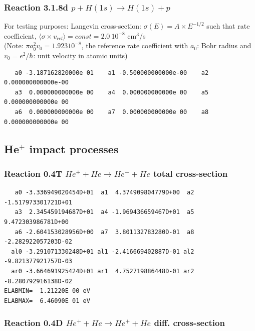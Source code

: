 \documentclass[12pt,dvips]{article}
\begin{document}
\subsubsection{
Reaction 3.1.8d $  p + H(1s) \rightarrow H(1s) + p  $
}
For testing purposes:
Langevin cross-section: $\sigma(E)=A \times E^{-1/2}$ such that rate coefficient, $\langle\sigma \times v_{rel} \rangle= const = 2.0~ 10^{-8}$ cm$^3$/s\\
(Note: $\pi a_0^2 v_0 = 1.923 10^{-8}$, the reference rate coefficient with $a_0$: Bohr radius
and $v_0 =e^2/\hbar$: unit velocity in atomic units)

\begin{small}\begin{verbatim}
   a0 -3.187162820000e 01    a1 -0.500000000000e-00    a2  0.000000000000e-00
   a3  0.000000000000e 00    a4  0.000000000000e 00    a5  0.000000000000e 00
   a6  0.000000000000e 00    a7  0.000000000000e 00    a8  0.000000000000e 00
\end{verbatim}\end{small}

\newpage
\subsection{He$^+$ impact processes}
\subsubsection{
Reaction 0.4T   $  He^+ + He \rightarrow He^+ + He $  total cross-section
}



\begin{small}\begin{verbatim}
   a0 -3.336949020454D+01  a1  4.374909804779D+00  a2 -1.517973301721D+01
   a3  2.345459194687D+01  a4 -1.969436659467D+01  a5  9.472303986781D+00
   a6 -2.604153028956D+00  a7  3.801132783280D-01  a8 -2.282922057203D-02
  al0 -3.291071330248D+01 al1 -2.416669402887D-01 al2 -9.821377921757D-03
  ar0 -3.664691925424D+01 ar1  4.752719886448D-01 ar2 -8.280792916138D-02
ELABMIN=  1.21220E 00 eV
ELABMAX=  6.46090E 01 eV
\end{verbatim}\end{small}

\subsubsection{
Reaction 0.4D    $He^+ + He \rightarrow He^+ + He$   diff. cross-section
}
\end{document}
